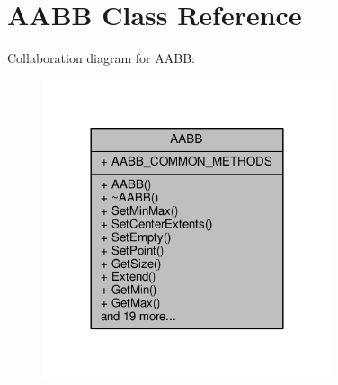 \hypertarget{classAABB}{}\section{A\+A\+BB Class Reference}
\label{classAABB}


Collaboration diagram for A\+A\+BB\+:
\nopagebreak
\begin{figure}[H]
\begin{center}
\leavevmode
\includegraphics[width=240pt]{d6/d68/classAABB__coll__graph}
\end{center}
\end{figure}
